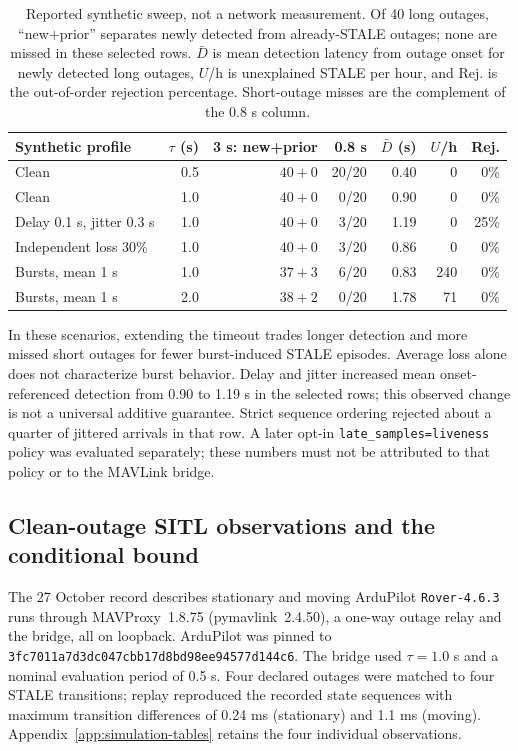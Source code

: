\documentclass[11pt,a4paper]{article}
\newcommand{\code}[1]{\texttt{#1}}
\begin{document}
\begin{table}[htbp]
\centering\small
\setlength{\tabcolsep}{4pt}
\begin{tabular}{@{}p{35mm}rrrrrr@{}}
\toprule
Synthetic profile & $\tau$ (s) & 3 s: new+prior & 0.8 s & $\bar D$ (s) & $U$/h & Rej. \\
\midrule
Clean & 0.5 & $40+0$ & 20/20 & 0.40 & 0 & 0\% \\
Clean & 1.0 & $40+0$ & 0/20 & 0.90 & 0 & 0\% \\
Delay 0.1 s, jitter 0.3 s & 1.0 & $40+0$ & 3/20 & 1.19 & 0 & 25\% \\
Independent loss 30\% & 1.0 & $40+0$ & 3/20 & 0.86 & 0 & 0\% \\
Bursts, mean 1 s & 1.0 & $37+3$ & 6/20 & 0.83 & 240 & 0\% \\
Bursts, mean 1 s & 2.0 & $38+2$ & 0/20 & 1.78 & 71 & 0\% \\
\bottomrule
\end{tabular}
\caption{Reported synthetic sweep, not a network measurement.
Of 40 long outages, ``new+prior'' separates newly detected from already-STALE
outages; none are missed in these selected rows. $\bar D$ is mean detection
latency from outage onset for newly detected long outages, $U$/h is
unexplained STALE per hour, and Rej. is the out-of-order rejection percentage.
Short-outage misses are the complement of the 0.8 s column.}
\label{tab:synthetic-sweep}
\end{table}

In these scenarios, extending the timeout trades longer detection and more
missed short outages for fewer burst-induced STALE episodes. Average loss
alone does not characterize burst behavior. Delay and jitter increased
mean onset-referenced detection from 0.90 to 1.19 s in the selected rows;
this observed change is not a universal additive guarantee. Strict sequence
ordering rejected about a quarter of jittered arrivals in that row. A later
opt-in \code{late\_samples=liveness} policy was evaluated separately; these
numbers must not be attributed to that policy or to the MAVLink bridge.

\subsection{Clean-outage SITL observations and the conditional bound}
The 27 October record describes stationary and moving ArduPilot
\code{Rover-4.6.3} runs through MAVProxy~1.8.75 (pymavlink~2.4.50), a
one-way outage relay and the bridge, all on loopback. ArduPilot was pinned
to \code{3fc7011a7d3dc047cbb17d8bd98ee94577d144c6}. The bridge used
$\tau=1.0$ s and a nominal evaluation period of 0.5 s. Four declared
outages were matched to four STALE transitions; replay reproduced the
recorded state sequences with maximum transition differences of 0.24 ms
(stationary) and 1.1 ms (moving). Appendix~\ref{app:simulation-tables}
retains the four individual observations.
\end{document}
